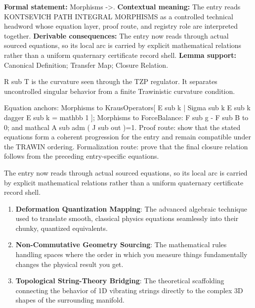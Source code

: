 \begingroup\footnotesize\setlength{\emergencystretch}{3em}\sloppy
\textbf{Formal statement:} Morphisms ->. \textbf{Contextual meaning:} The entry reads KONTSEVICH PATH INTEGRAL MORPHISMS as a controlled technical headword whose equation layer, proof route, and registry role are interpreted together. \textbf{Derivable consequences:} The entry now reads through actual sourced equations, so its local arc is carried by explicit mathematical relations rather than a uniform quaternary certificate record shell. \textbf{Lemma support:} Canonical Definition; Transfer Map; Closure Relation.\par
\endgroup

R sub T is the curvature seen through the TZP regulator. It separates uncontrolled singular behavior from a finite Trawinistic curvature condition.

Equation anchors: Morphisms to KrausOperators[ E sub k | Sigma sub k E sub k dagger E sub k = mathbb 1 ]; Morphisms to ForceBalance: F sub g - F sub B to 0; and mathcal A sub adm ( J sub out )=1. Proof route: show that the stated equations form a coherent progression for the entry and remain compatible under the TRAWIN ordering. Formalization route: prove that the final closure relation follows from the preceding entry-specific equations.

The entry now reads through actual sourced equations, so its local arc is carried by explicit mathematical relations rather than a uniform quaternary certificate record shell.
\endgroup

\begin{enumerate}[leftmargin=1.6em,itemsep=6pt,topsep=4pt]
\item \textbf{Deformation Quantization Mapping}: The advanced algebraic technique used to translate smooth, classical physics equations seamlessly into their chunky, quantized equivalents.
\item \textbf{Non-Commutative Geometry Sourcing}: The mathematical rules handling spaces where the order in which you measure things fundamentally changes the physical result you get.
\item \textbf{Topological String-Theory Bridging}: The theoretical scaffolding connecting the behavior of 1D vibrating strings directly to the complex 3D shapes of the surrounding manifold.
\end{enumerate}

